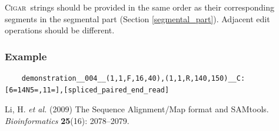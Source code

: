 \documentclass[10pt,a4paper]{article}
\newcommand{\CIGAR}{\textsc{Cigar}}
\begin{document}
\medskip

\CIGAR\ strings should be provided in the same order as their corresponding segments in the {segmental part} (Section \ref{segmental_part}). Adjacent edit operations should be different.

\subsubsection*{Example}

\begin{framed}\small
\begin{verbatim}
	demonstration__004__(1,1,F,16,40),(1,1,R,140,150)__C:[6=14N5=,11=],[spliced_paired_end_read]
\end{verbatim}
\end{framed}





\begin{thebibliography}{}
	Li, H. \textit{et al.} (2009)
	The Sequence Alignment/Map format and SAMtools.
	\textit{Bioinformatics} \textbf{25}(16): 2078--2079.
\end{thebibliography}
\end{document}
